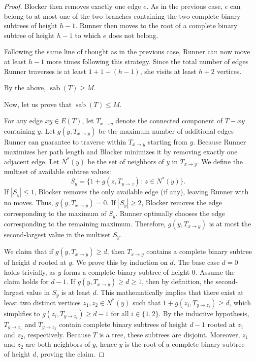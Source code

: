 \documentclass[12pt]{article}
\DeclareMathOperator{\sab}{\mathrm{sab}}
\begin{document}
\begin{proof}
Blocker then removes exactly one edge $e$. As in the previous case, $e$ can belong to at most one of the two branches containing the two complete binary subtrees of height $h-1$. Runner then moves to the root of a complete binary subtree of height $h-1$ to which $e$ does not belong. 

Following the same line of thought as in the previous case, Runner can now move at least $h-1$ more times following this strategy. Since the total number of edges Runner traverses is at least $1 + 1 + (h-1)$, she visits at least $h + 2$ vertices.

By the above, $\sab(T) \ge M$. 

Now, let us prove that $\sab(T)\le M$. 

For any edge $xy \in E(T)$, let $T_{x \to y}$ denote the connected component of $T - xy$ containing $y$. Let $g(y, T_{x \to y})$ be the maximum number of additional edges Runner can guarantee to traverse within $T_{x \to y}$ starting from $y$. Because Runner maximizes her path length and Blocker minimizes it by removing exactly one adjacent edge. Let $N^*(y)$ be the set of neighbors of $y$ in $T_{x \to y}$. We define the multiset of available subtree values:
$$S_y = \{ 1 + g(z, T_{y \to z}):\ z \in N^*(y) \}.$$
If $|S_y| \le 1$, Blocker removes the only available edge (if any), leaving Runner with no moves. Thus, $g(y, T_{x \to y}) = 0$. 
If $|S_y| \ge 2$, Blocker removes the edge corresponding to the maximum of $S_y$. Runner optimally chooses the edge corresponding to the remaining maximum. Therefore, $g(y, T_{x \to y})$ is at most the second-largest value in the multiset $S_y$.

We claim that if $g(y, T_{x \to y}) \ge d$, then $T_{x \to y}$ contains a complete binary subtree of height $d$ rooted at $y$. We prove this by induction on $d$. The base case $d=0$ holds trivially, as $y$ forms a complete binary subtree of height $0$. Assume the claim holds for $d-1$. If $g(y, T_{x \to y}) \ge d \ge 1$, then by definition, the second-largest value in $S_y$ is at least $d$. This mathematically implies that there exist at least two distinct vertices $z_1, z_2 \in N^*(y)$ such that $1 + g(z_i, T_{y \to z_i}) \ge d$, which simplifies to $g(z_i, T_{y \to z_i}) \ge d-1$ for all $i \in \{1, 2\}$. By the inductive hypothesis, $T_{y \to z_1}$ and $T_{y \to z_2}$ contain complete binary subtrees of height $d-1$ rooted at $z_1$ and $z_2$, respectively. Because $T$ is a tree, these subtrees are disjoint. Moreover, $z_1$ and $z_2$ are both neighbors of $y$, hence $y$ is the root of a complete binary subtree of height $d$, proving the claim.


\end{proof}
\end{document}
